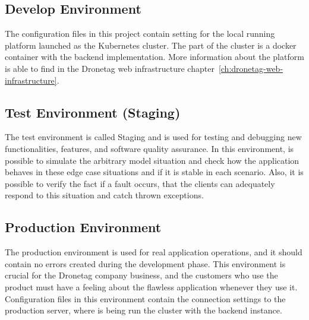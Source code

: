 \subsection{Develop Environment}\label{subsec:develop-environment}
The configuration files in this project contain setting for the local running platform launched as the Kubernetes cluster.
The part of the cluster is a docker container with the backend implementation.
More information about the platform is able to find in the Dronetag web infrastructure chapter~\ref{ch:dronetag-web-infrastructure}.


\subsection{Test Environment (Staging)}\label{subsec:test-environment}
The test environment is called Staging and is used for testing and debugging new functionalities, features, and software quality assurance.\cite{sqa}
In this environment, is possible to simulate the arbitrary model situation and check how the application behaves in these edge case situations and if it is stable in each scenario.
Also, it is possible to verify the fact if a fault occurs, that the clients can adequately respond to this situation and catch thrown exceptions.


\subsection{Production Environment}\label{subsec:production-environment}
The production environment is used for real application operations, and it should contain no errors created during the development phase.
This environment is crucial for the Dronetag company business, and the customers who use the product must have a feeling about the flawless application whenever they use it.
Configuration files in this environment contain the connection settings to the production server, where is being run the cluster with the backend instance.
